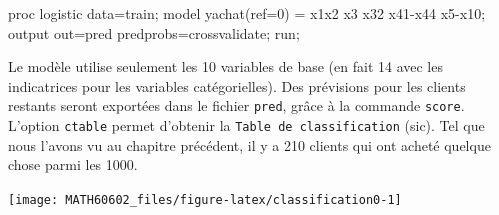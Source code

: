 \documentclass[
  11pt,
  letterpaper,
]{book}
\newenvironment{Shaded}{\begin{snugshade}}{\end{snugshade}}
\newcommand{\NormalTok}[1]{#1}
\theoremstyle{definition}
\theoremstyle{definition}
\theoremstyle{definition}
\theoremstyle{definition}
\theoremstyle{remark}
\begin{document}
\begin{Shaded}
\begin{Highlighting}[]
\NormalTok{proc logistic data=train;}
\NormalTok{model yachat(ref=\textquotesingle{}0\textquotesingle{}) = x1x2 x3 x32 x41{-}x44 x5{-}x10;}
\NormalTok{output out=pred predprobs=crossvalidate;}
\NormalTok{run;}
\end{Highlighting}
\end{Shaded}

Le modèle utilise seulement les 10 variables de base (en fait 14 avec les indicatrices pour les variables catégorielles). Des prévisions pour les clients restants seront exportées dans le fichier \texttt{pred}, grâce à la commande \texttt{score}. L'option \texttt{ctable} permet d'obtenir la \texttt{Table\ de\ classification} (sic). Tel que nous l'avons vu au chapitre précédent, il y a 210 clients qui ont acheté quelque chose parmi les 1000.

\begin{center}\texttt{[image: MATH60602\_files/figure-latex/classification0-1]} \end{center}
\end{document}
